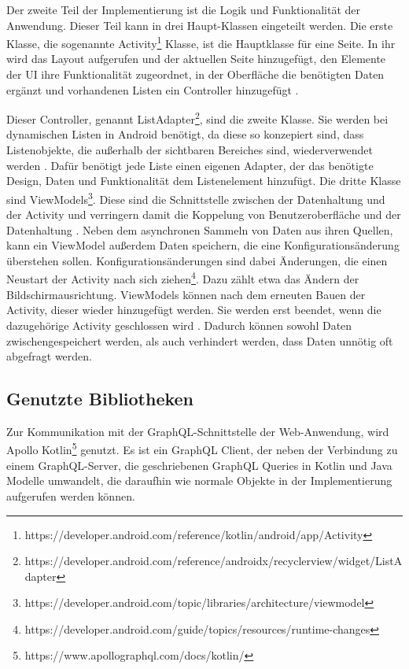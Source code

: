 Der zweite Teil der Implementierung ist die Logik und Funktionalität der Anwendung. Dieser Teil kann in drei Haupt-Klassen eingeteilt werden. 
Die erste Klasse, die sogenannte Activity\footnote{https://developer.android.com/reference/kotlin/android/app/Activity} Klasse, ist die Hauptklasse für eine Seite. In ihr wird das Layout aufgerufen und der aktuellen Seite hinzugefügt, den Elemente der UI ihre Funktionalität zugeordnet, in der Oberfläche die benötigten Daten ergänzt und vorhandenen Listen ein Controller hinzugefügt \cite{sarkar_android}.

Dieser Controller, genannt ListAdapter\footnote{https://developer.android.com/reference/androidx/recyclerview/widget/ListAdapter}, sind die zweite Klasse. Sie werden bei dynamischen Listen in Android benötigt, da diese so konzepiert sind, dass Listenobjekte, die außerhalb der sichtbaren Bereiches sind, wiederverwendet werden \cite{recyclerview_android}. Dafür benötigt jede Liste einen eigenen Adapter, der das benötigte Design, Daten und Funktionalität dem Listenelement hinzufügt.
Die dritte Klasse sind ViewModels\footnote{https://developer.android.com/topic/libraries/architecture/viewmodel}. Diese sind die Schnittstelle zwischen der Datenhaltung und der Activity und verringern damit die Koppelung von Benutzeroberfläche und der Datenhaltung \cite{viewModel_android}. Neben dem asynchronen Sammeln von Daten aus ihren Quellen, kann ein ViewModel außerdem Daten speichern, die eine Konfigurationsänderung überstehen sollen. Konfigurationsänderungen sind dabei Änderungen, die einen Neustart der Activity nach sich ziehen\footnote{https://developer.android.com/guide/topics/resources/runtime-changes}. Dazu zählt etwa das Ändern der Bildschirmausrichtung. ViewModels können nach dem erneuten Bauen der Activity, dieser wieder hinzugefügt werden. Sie werden erst beendet, wenn die dazugehörige Activity geschlossen wird \cite{Android_Room}. Dadurch können sowohl Daten zwischengespeichert werden, als auch verhindert werden, dass Daten unnötig oft abgefragt werden.


\subsection{Genutzte Bibliotheken}
Zur Kommunikation mit der GraphQL-Schnittstelle der Web-Anwendung, wird Apollo Kotlin\footnote{https://www.apollographql.com/docs/kotlin/} genutzt. 
Es ist ein GraphQL Client, der neben der Verbindung zu einem GraphQL-Server, die geschriebenen GraphQL Queries in Kotlin und Java Modelle umwandelt, die daraufhin wie normale Objekte in der Implementierung aufgerufen werden können.


